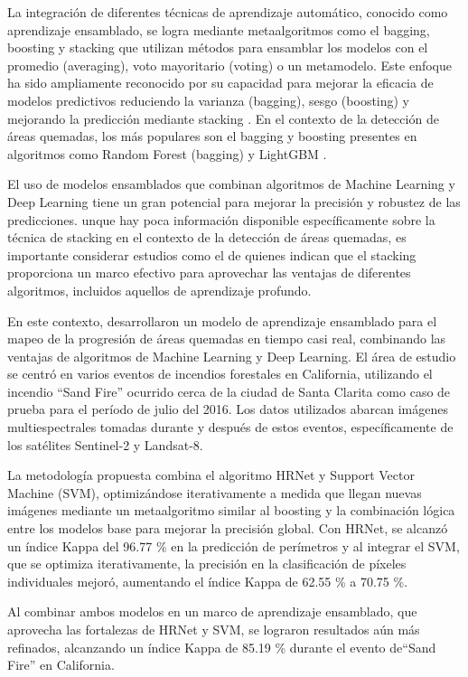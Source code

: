 La integración de diferentes técnicas de aprendizaje automático, conocido como aprendizaje ensamblado, se logra mediante metaalgoritmos como el bagging, boosting y stacking que utilizan métodos para ensamblar los modelos con el 
promedio (averaging), voto mayoritario (voting) o un metamodelo. Este enfoque ha sido ampliamente reconocido por su capacidad para mejorar la eficacia de modelos predictivos reduciendo la varianza (bagging), sesgo (boosting) y mejorando la predicción 
mediante stacking \citep{saini_ensemble_2017}. En el contexto de la detección de áreas quemadas, los más populares son el bagging y boosting presentes en algoritmos como Random Forest (bagging) y 
LightGBM \citep{mienye_survey_2022}.

El uso de modelos ensamblados que combinan algoritmos de Machine Learning y Deep Learning tiene un gran potencial para mejorar la precisión y robustez de las predicciones. unque hay poca información disponible específicamente sobre la técnica de stacking en 
el contexto de la detección de áreas quemadas, es importante considerar estudios como el de \citet{zhang_review_2022} quienes indican que el stacking proporciona un marco efectivo para aprovechar las ventajas de diferentes algoritmos, incluidos aquellos de 
aprendizaje profundo.

En este contexto, \citet{hu_near_2024} desarrollaron un modelo de aprendizaje ensamblado para el mapeo de la progresión de áreas quemadas en tiempo casi real, combinando las ventajas de algoritmos de Machine Learning y Deep
Learning. El área de estudio se centró en varios eventos de incendios forestales en California, utilizando el incendio ``Sand Fire'' ocurrido cerca de la ciudad de Santa Clarita como caso de prueba para el período de julio del 2016. Los 
datos utilizados abarcan imágenes multiespectrales tomadas durante y después de estos eventos, específicamente de los satélites Sentinel-2 y Landsat-8.

La metodología propuesta combina el algoritmo HRNet y Support Vector Machine (SVM), optimizándose iterativamente a medida que llegan nuevas imágenes mediante un metaalgoritmo similar al boosting y la combinación lógica entre los modelos base para 
mejorar la precisión global. Con HRNet, se alcanzó un índice Kappa del 96.77 \% en la predicción de perímetros y al integrar el SVM, que se optimiza iterativamente, la precisión en la clasificación de píxeles individuales mejoró, aumentando el índice Kappa de 62.55 \% 
a 70.75 \%. 

Al combinar ambos modelos en un marco de aprendizaje ensamblado, que aprovecha las fortalezas de HRNet y SVM, se lograron resultados aún más refinados, alcanzando un índice Kappa de 85.19 \% durante el evento de``Sand Fire'' en California.

